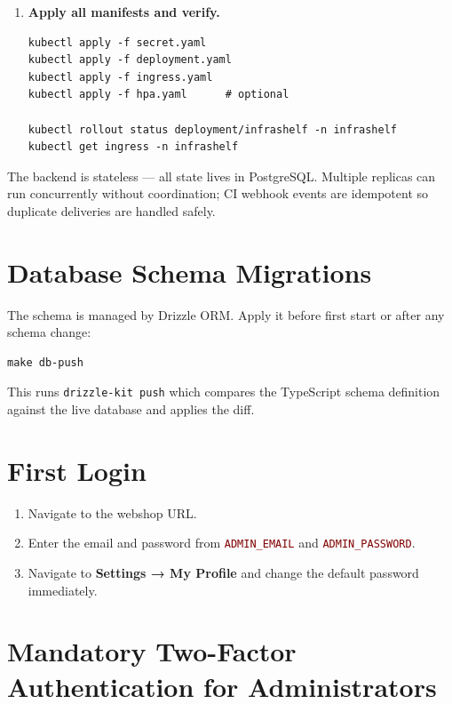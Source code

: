 \documentclass[12pt,a4paper,twoside]{report}
\newcommand{\notebox}[1]{\begin{tcolorbox}[noteboxstyle]#1\end{tcolorbox}}
\newcommand{\code}[1]{\texttt{#1}}
\newcommand{\env}[1]{\texttt{\textcolor{Maroon}{#1}}}
\begin{document}
\begin{enumerate}
\item \textbf{Apply all manifests and verify.}
\begin{lstlisting}[style=bash]
kubectl apply -f secret.yaml
kubectl apply -f deployment.yaml
kubectl apply -f ingress.yaml
kubectl apply -f hpa.yaml      # optional

kubectl rollout status deployment/infrashelf -n infrashelf
kubectl get ingress -n infrashelf
\end{lstlisting}

\end{enumerate}

\notebox{The backend is stateless — all state lives in PostgreSQL. Multiple
replicas can run concurrently without coordination; CI webhook events are
idempotent so duplicate deliveries are handled safely.}

\section{Database Schema Migrations}

The schema is managed by Drizzle ORM. Apply it before first start or
after any schema change:

\begin{lstlisting}[style=bash]
make db-push
\end{lstlisting}

This runs \code{drizzle-kit push} which compares the TypeScript schema
definition against the live database and applies the diff.

\section{First Login}

\begin{enumerate}
  \item Navigate to the webshop URL.
  \item Enter the email and password from \env{ADMIN\_EMAIL} and
        \env{ADMIN\_PASSWORD}.
  \item Navigate to \textbf{Settings → My Profile} and change the
        default password immediately.
\end{enumerate}

\section{Mandatory Two-Factor Authentication for Administrators}
\label{sec:root-2fa}
\end{document}
